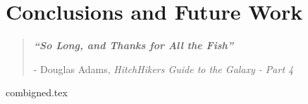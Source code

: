 

\chapter{ Conclusions and Future Work }\label{ch6}





\blankpage
\restoregeometry
\vspace*{0.15\paperheight}


\begin{center}
\begin{quotation}
  \large{\emph{\textbf{``So Long, and Thanks for All the Fish''} }  }  \\
  \begin{flushright}
  - Douglas Adams, \textit{HitchHikers Guide to the Galaxy - Part 4}
  \end{flushright}
 \end{quotation}
\end{center}
\doublespacing



 \onehalfspacing

%
 \newpage

%
{combigned.tex}
%
